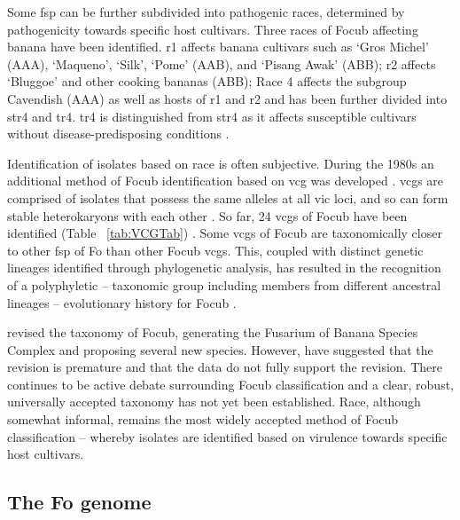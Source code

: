 Some \ac{fsp} can be further subdivided into pathogenic races, determined by pathogenicity towards specific host cultivars. Three races of \ac{Focub} affecting banana have been identified. \acf{r1}  affects banana cultivars such as ‘Gros Michel’ (AAA), ‘Maqueno’, ‘Silk’, ‘Pome’ (AAB), and ‘Pisang Awak’ (ABB); \acf{r2} affects ‘Bluggoe’ and other cooking bananas (ABB); Race 4 affects the subgroup Cavendish (AAA) as well as hosts of \ac{r1} and \ac{r2} \parencite{Ploetz2015a} and has been further divided into \ac{str4} and \acl{tr4}. \Ac{tr4} is distinguished from \ac{str4} as it affects susceptible cultivars without disease-predisposing conditions \parencite{Ploetz2015b}.  

Identification of isolates based on race is often subjective. During the 1980s an additional method of \ac{Focub} identification based on \ac{vcg} was developed \parencite{Correll1991}. \acp{vcg} are comprised of isolates that possess the same alleles at all \ac{vic} loci, and so can form stable heterokaryons with each other \parencite{Correll1991}. So far, 24 \acp{vcg} of \ac{Focub} have been identified (Table ~\ref{tab:VCGTab}) \parencite{Czislowski2018}. Some \acp{vcg} of \ac{Focub} are taxonomically closer to other \ac{fsp} of \ac{Fo} than other \ac{Focub} \acp{vcg}. This, coupled with distinct genetic lineages identified through phylogenetic analysis, has resulted in the recognition of a polyphyletic – taxonomic group including members from different ancestral lineages – evolutionary history for \ac{Focub} \parencite{Koenig1997, Ploetz2007}. 

\textcite{Maryani2019} revised the taxonomy of \ac{Focub}, generating the Fusarium of Banana Species Complex and proposing several new species. However, \textcite{Torres2021} have suggested that the revision is premature and that the data do not fully support the revision. There continues to be active debate surrounding \ac{Focub} classification and a clear, robust, universally accepted taxonomy has not yet been established. Race, although somewhat informal, remains the most widely accepted method of \ac{Focub} classification – whereby isolates are identified based on virulence towards specific host cultivars.  

\afterpage{



\clearpage
}

\subsection{The \acl{Fo} genome} 

